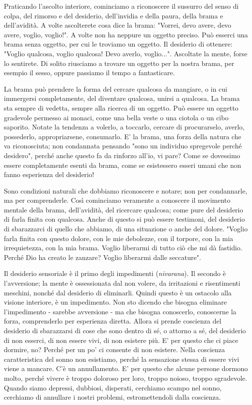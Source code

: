 
Praticando l'ascolto interiore, cominciamo a riconoscere il sussurro del
senso di colpa, del rimorso e del desiderio, dell'invidia e della paura,
della brama e dell'avidità. A volte ascolterete cosa dice la brama:
"Vorrei, devo avere, devo avere, voglio, voglio!". A volte non ha
neppure un oggetto preciso. Può esserci una brama senza oggetto, per cui
le troviamo un oggetto. Il desiderio di ottenere: "Voglio qualcosa,
voglio qualcosa! Devo averlo, voglio...". Ascoltate la mente, forse lo
sentirete. Di solito riusciamo a trovare un oggetto per la nostra brama,
per esempio il sesso, oppure passiamo il tempo a fantasticare.

La brama può prendere la forma del cercare qualcosa da mangiare, o in
cui immergersi completamente, del diventare qualcosa, unirsi a qualcosa.
La brama sta sempre di vedetta, sempre alla ricerca di un oggetto. Può
essere un oggetto gradevole permesso ai monaci, come una bella veste o
una ciotola o un cibo saporito. Notate la tendenza a volerlo, a
toccarlo, cercare di procurarselo, averlo, possederlo, appropriarsene,
consumarlo. E' la brama, una forza della natura che va riconosciuta; non
condannata pensando "sono un individuo spregevole perché desidero",
perché anche questo fa da rinforzo all'io, vi pare? Come se dovessimo
essere completamente esenti da brama, come se esistessero esseri umani
che non fanno esperienza del desiderio!

Sono condizioni naturali che dobbiamo riconoscere e notare; non per
condannarle, ma per comprenderle. Così cominciamo veramente a conoscere
il movimento mentale della brama, dell'avidità, del ricercare qualcosa;
come pure del desiderio di farla finita con qualcosa. Anche di questo si
può essere testimoni, del desiderio di sbarazzarci di quello che
abbiamo, di una situazione o anche del dolore. "Voglio farla finita con
questo dolore, con le mie debolezze, con il torpore, con la mia
irrequietezza, con la mia brama. Voglio liberarmi di tutto ciò che mi dà
fastidio. Perché Dio ha creato le zanzare? Voglio liberarmi dalle
seccature".

Il desiderio sensoriale è il primo degli impedimenti (\textit{nīvarana}). Il
secondo è l'avversione; la mente è ossessionata dal non volere, da
irritazioni e risentimenti meschini, nonché dal desiderio di eliminarli.
Quindi questo è un ostacolo alla visione interiore, è un impedimento.
Non sto dicendo che bisogna eliminare l'impedimento - sarebbe avversione
- ma che bisogna conoscerlo, conoscerne la forza, comprenderlo per
esperienza diretta. Allora si prende coscienza del desiderio di
sbarazzarsi di cose che sono dentro di sé, o attorno a sé, del desiderio
di non esserci, di non essere vivi, di non esistere più. E' per questo
che ci piace dormire, no? Perché per un po' ci consente di non esistere.
Nella coscienza caratteristica del sonno non esistiamo, perché la
sensazione stessa di essere vivi viene a mancare. C'è un annullamento.
E' per questo che alcune persone dormono molto, perché vivere è troppo
doloroso per loro, troppo noioso, troppo sgradevole. Quando siamo
depressi, dubbiosi, disperati, cerchiamo scampo nel sonno, cerchiamo di
annullare i nostri problemi, estromettendoli dalla coscienza.


